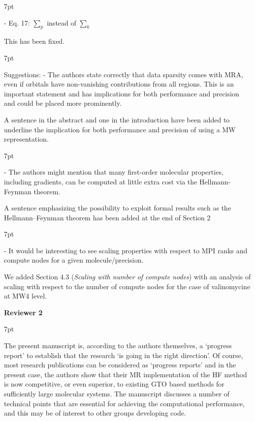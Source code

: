 \documentclass[11pt]{article}
\newenvironment{formal}{%
  \def\FrameCommand{%
    \hspace{1pt}%
    {\color{darkblue}\vrule width 2pt}%
    {\color{formalshade}\vrule width 4pt}%
    \colorbox{formalshade}%
  }%
  \MakeFramed{\advance\hsize-\width\FrameRestore}%
  \noindent\hspace{-4.55pt}%
  \begin{adjustwidth}{}{7pt}%
  \vspace{2pt}\vspace{2pt}%
}
{%
  \vspace{2pt}\end{adjustwidth}\endMakeFramed%
}
\begin{document}
 \begin{formal}
 - Eq. 17: $\sum_p$ instead of $\sum_k$
 \end{formal}

This has been fixed.






\begin{formal}
Suggestions:
 - The authors state correctly that data sparsity comes with MRA, even if orbitals have non-vanishing contributions from all regions. This is an important statement and has implications for both performance and precision and could be placed more prominently.
\end{formal}

A sentence in the abstract and one in the introduction have been added to underline the implication for both performance and precision of using a MW representation.











\begin{formal}
 - The authors might mention that many first-order molecular properties, including gradients, can be computed at little extra cost via the Hellmann-Feynman theorem.
\end{formal}

A sentence emphasizing the possibility to exploit formal results such as the Hellmann--Feynman theorem has been added at the end of Section 2

\begin{formal}
 - It would be interesting to see scaling properties with respect to MPI ranks and compute nodes for a given molecule/precision.
\end{formal}

We added Section 4.3 (\emph{Scaling with number of compute nodes}) with an analysis of scaling with respect to the number of compute nodes for the case of valinomycine at MW4 level.


\clearpage

{\bf Reviewer 2}

\begin{formal}
The present manuscript is, according to the authors themselves, a ‘progress report’ to establish that the research ‘is going in the right direction’. Of course, most research publications can be considered as ‘progress reports’ and in the present case, the authors show that their MR implementation of the HF method is now competitive, or even superior, to existing GTO based methods for sufficiently large molecular systems. The manuscript discusses a number of technical points that are essential for achieving the computational performance, and this may be of interest to other groups developing code.
\end{formal}
\end{document}
